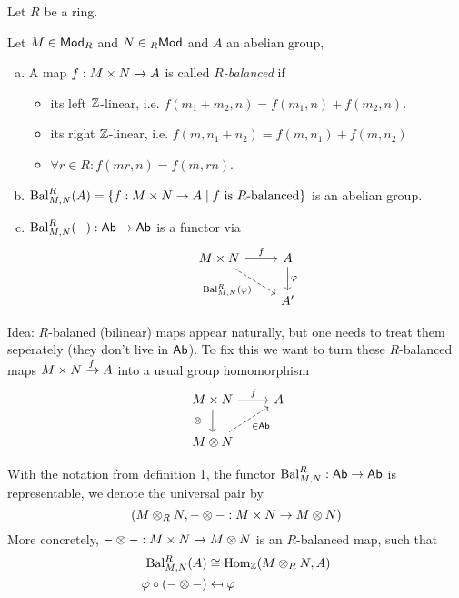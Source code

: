 \documentclass[a4paper]{report}
\begin{document}
Let $R$ be a ring.
\begin{defi}
  Let $M \in \mathsf{Mod}_R$ and $N \in {}_R\mathsf{Mod}$ and $A$ an abelian group,
  \begin{enumerate}[(a)]
    \item A map $f: M  \times N \to A$ is called $R$\emph{-balanced} if
          \begin{itemize}
            \item its left $\mathbb{Z}$-linear, i.e. $f(m_{1}+m_{2}, n) = f(m_{1}, n) + f(m_{2}, n)$.
            \item its right $\mathbb{Z}$-linear, i.e. $f(m, n_{1}+n_{2}) = f(m, n_{1}) + f(m, n_{2})$
                  \item $\forall r \in R: f(mr, n) = f(m, rn)$.
          \end{itemize}
    \item $\operatorname{Bal}_{M,N}^{R}(A) = \{f: M \times N \to A\mid f \text{ is }R\text{-balanced}\}$ is an abelian group.
          \item $\operatorname{Bal}_{M,N}^{R}(-): \mathsf{Ab} \to \mathsf{Ab}$ is a functor via \[\begin{tikzcd}
M \times N \arrow[r, "f"] \arrow[rd, "{\mathrm{Bal}_{M,N}^R(\varphi)}"', dashed] & A \arrow[d, "\varphi"] \\
                                                                                 & A'
                                                                               \end{tikzcd}\]
  \end{enumerate}
  Idea: $R$-balaned (bilinear) maps appear naturally, but one needs to treat them seperately (they don't live in $\mathsf{Ab}$). To fix this we want to turn these $R$-balanced maps $M\times N \xrightarrow f A$ into a usual group homomorphism \[\begin{tikzcd}
M \times N \arrow[r, "f"] \arrow[d, "- \otimes -"'] & A \\
M \otimes N \arrow[ru, "\in \mathsf{Ab}"', dashed]  &
\end{tikzcd}\]
\end{defi}
\begin{thm}
 With the notation from definition 1, the functor $\operatorname{Bal}_{M,N}^{R}: \mathsf{Ab} \to \mathsf{Ab}$ is representable, we denote the universal pair by \[(M \otimes_{R} N, - \otimes - : M\times N \to M \otimes N)\]
More concretely, $- \otimes -: M \times N \to M \otimes N$ is an $R$-balanced map, such that \begin{align*}
\bal_{M,N}^{R}(A) &\cong \Hom_{\Z}(M \otm_{R} N , A) \\ \ph \c (- \otm -) &\mpsfrom \ph
\end{align*}
\end{thm}
\end{document}
